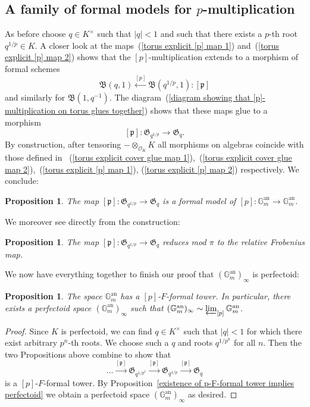 \documentclass[10pt,oneside]{amsart}
\newtheorem{proposition}[theorem]{Proposition}
\theoremstyle{definition}
\begin{document}
	\subsection{A family of formal models for $p$-multiplication}
	As before choose $q\in K^\times$ such that $|q|<1$ and such that there exists a $p$-th root $q^{1/p} \in K$. A closer look at the maps~(\ref{torus explicit [p] map 1}) and~(\ref{torus explicit [p] map 2}) shows that the $[p]$-multiplication extends to a morphism of formal schemes
	\[\mathfrak B(q,1)\xleftarrow{[p]} \mathfrak B(q^{1/p},1):[\mathfrak p]\]
	and similarly for $\mathfrak B(1,q^{-1})$. The diagram~(\ref{diagram showing that [p]-multiplication on torus glues together}) shows that these maps glue to a morphism
	\[[\mathfrak p]: \mathfrak G_{q^{1/p}}\rightarrow  \mathfrak G_q.\]
	By construction, after tensoring $-\otimes_{\mathcal O_K} K$ all morphisms on algebras coincide with those defined in ~(\ref{torus explicit cover glue map 1}),~(\ref{torus explicit cover glue map 2}),~(\ref{torus explicit [p] map 1}), (\ref{torus explicit [p] map 2}) respectively. We conclude:
	\begin{proposition}
		The map $[\mathfrak p]: \mathfrak G_{q^{1/p}}\rightarrow  \mathfrak G_q$ is a formal model of $[p]:\mathbb G_m^{\operatorname{an}}\rightarrow \mathbb G_m^{\operatorname{an}}$.
	\end{proposition}
	We moreover see directly from the construction:
	\begin{proposition}
		The map $[\mathfrak p]: \mathfrak G_{q^{1/p}}\rightarrow  \mathfrak G_q$ reduces mod $\pi$ to the relative Frobenius map.
	\end{proposition}
	We now have everything together to finish our proof that $(\mathbb G_m^{\operatorname{an}})_\infty$ is perfectoid:
	\begin{proposition}
		The space $\mathbb G_m^{\operatorname{an}}$ has a $[p]$-$F$-formal tower. In particular, there exists a perfectoid space $(\mathbb G_m^{\operatorname{an}})_\infty$ such that $(\mathbb G_m^{\operatorname{an}})_\infty \sim \varprojlim_{[p]} \mathbb G_m^{\operatorname{an}}$.
	\end{proposition}
	\begin{proof}
		Since $K$ is perfectoid, we can find $q\in K^\times$ such that $|q|<1$ for which there exist arbitrary $p^n$-th roots. We choose such a $q$ and roots $q^{1/p^n}$ for all $n$. Then the two Propositions above combine to show that 
		\[\dots \xrightarrow{[\mathfrak p]} \mathfrak G_{q^{1/p^2}}\xrightarrow{[\mathfrak p]} \mathfrak G_{q^{1/p}}\xrightarrow{[\mathfrak p]} \mathfrak G_q\]
		is a $[p]$-$F$-formal tower.
		By Proposition~\ref{existence of p-F-formal tower implies perfectoid} we obtain a perfectoid space $(\mathbb G_m^{\operatorname{an}})_\infty$ as desired.
	\end{proof}
	
\end{document}
